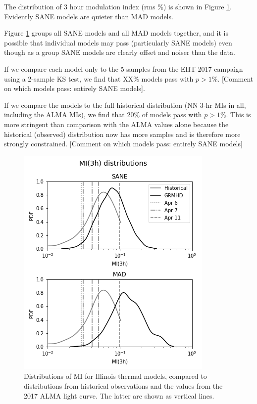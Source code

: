 
The distribution of 3 hour modulation index (rms \%) is shown in Figure \ref{fig:cmp_ALMA_var}.  Evidently SANE models are quieter than MAD models.

Figure \ref{fig:cmp_ALMA_var} groups all SANE models and all MAD models together, and it is possible that individual models may pass (particularly SANE models) even though as a group SANE models are clearly offset and noiser than the data.

If we compare each model only to the 5 samples from the EHT 2017 campaign using a 2-sample KS test, we find that XX\% models pass with $p > 1\%$.  [Comment on which models pass: entirely SANE models].

If we compare the models to the full historical distribution (NN 3-hr MIs in all, including the ALMA MIs), we find that 20\% of models pass with $p > 1\%$.  This is more stringent than comparison with the ALMA values alone because the historical (observed)  distribution now has more samples and is therefore more strongly constrained.  [Comment on which models pass: entirely SANE models]

\begin{figure}
  \centering
  \includegraphics[width=\columnwidth]{./figures/mi_dist.png}
  \caption{Distributions of MI for Illinois thermal models, compared to distributions from historical observations and the values from the 2017 ALMA light curve. The latter are shown as vertical lines.
  }
  \label{fig:cmp_ALMA_var}
\end{figure}

